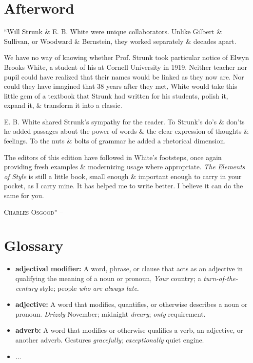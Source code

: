 \documentclass{article}
\numberwithin{equation}{section}
\begin{document}

\section{Afterword}
``Will Strunk \& E. B. White were unique collaborators. Unlike Gilbert \& Sullivan, or Woodward \& Bernstein, they worked separately \& decades apart.

We have no way of knowing whether Prof. Strunk took particular notice of Elwyn Brooks White, a student of his at Cornell University in 1919. Neither teacher nor pupil could have realized that their names would be linked as they now are. Nor could they have imagined that 38 years after they met, White would take this little gem of a textbook that Strunk had written for his students, polish it, expand it, \& transform it into a classic.

E. B. White shared Strunk's sympathy for the reader. To Strunk's do's \& don'ts he added passages about the power of words \& the clear expression of thoughts \& feelings. To the nuts \& bolts of grammar he added a rhetorical dimension.

The editors of this edition have followed in White's footsteps, once again providing fresh examples \& modernizing usage where appropriate. \textit{The Elements of Style} is still a little book, small enough \& important enough to carry in your pocket, as I carry mine. It has helped me to write better. I believe it can do the same for you.

\textsc{Charles Osgood}'' -- \cite[p. 104]{Strunk_White2019}


\section{Glossary}

\begin{itemize}
	\item \textbf{adjectival modifier:} A word, phrase, or clause that acts as an adjective in qualifying the meaning of a noun or pronoun, \textit{Your} country; a \textit{turn-of-the-century} style; people \textit{who are always late}.
	\item \textbf{adjective:} A word that modifies, quantifies, or otherwise describes a noun or pronoun. \textit{Drizzly} November; midnight \textit{dreary}; \textit{only} requirement.
	\item \textbf{adverb:} A word that modifies or otherwise qualifies a verb, an adjective, or another adverb. Gestures \textit{gracefully}; \textit{exceptionally} quiet engine.
	\item $\ldots$
\end{itemize}


\printbibliography[heading=bibintoc]
	
\end{document}
